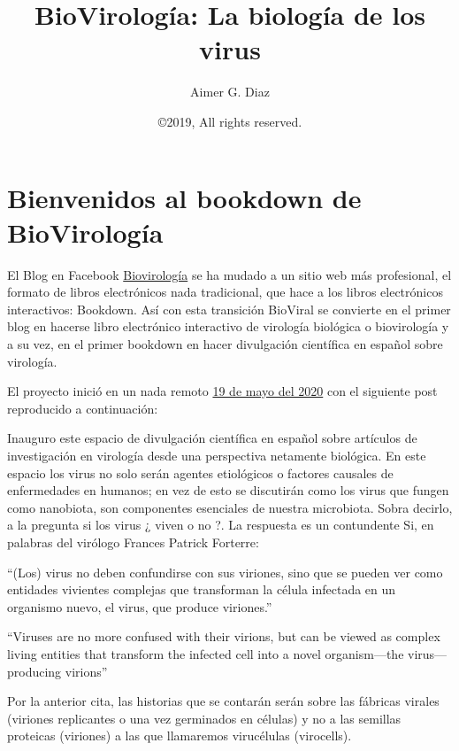 \documentclass[
  spanish,
]{book}
\title{BioVirología: La biología de los virus}
\author{Aimer G. Diaz}
\date{©2019, All rights reserved.}
\begin{document}
\maketitle

{
\setcounter{tocdepth}{1}
\tableofcontents
}
\hypertarget{bienvenidos-al-bookdown-de-biovirologuxeda}{%
\chapter{Bienvenidos al bookdown de BioVirología}\label{bienvenidos-al-bookdown-de-biovirologuxeda}}

El Blog en Facebook \href{https://www.facebook.com/BioViral/}{Biovirología} se ha mudado a un sitio web más profesional, el formato de libros electrónicos nada tradicional, que hace a los libros electrónicos interactivos: Bookdown. Así con esta transición BioViral se convierte en el primer blog en hacerse libro electrónico interactivo de virología biológica o biovirología y a su vez, en el primer bookdown en hacer divulgación científica en español sobre virología.

El proyecto inició en un nada remoto \href{https://www.facebook.com/permalink.php?story_fbid=107125457678944\&id=107088044349352}{19 de mayo del 2020} con el siguiente post reproducido a continuación:

Inauguro este espacio de divulgación científica en español sobre artículos de investigación en virología desde una perspectiva netamente biológica. En este espacio los virus no solo serán agentes etiológicos o factores causales de enfermedades en humanos; en vez de esto se discutirán como los virus que fungen como nanobiota, son componentes esenciales de nuestra microbiota.
Sobra decirlo, a la pregunta si los virus ¿ viven o no ?. La respuesta es un contundente Si, en palabras del virólogo Frances Patrick Forterre:

``(Los) virus no deben confundirse con sus viriones, sino que se pueden ver como entidades vivientes complejas que transforman la célula infectada en un organismo nuevo, el virus, que produce viriones.''

``Viruses are no more confused with their virions, but can be viewed as complex living entities that transform the infected cell into a novel organism---the virus---producing virions'' \citet{forterre2010defining}

Por la anterior cita, las historias que se contarán serán sobre las fábricas virales (viriones replicantes o una vez germinados en células) y no a las semillas proteicas (viriones) a las que llamaremos virucélulas (virocells). \citet{mukhopadhyay2003structure}
\end{document}
